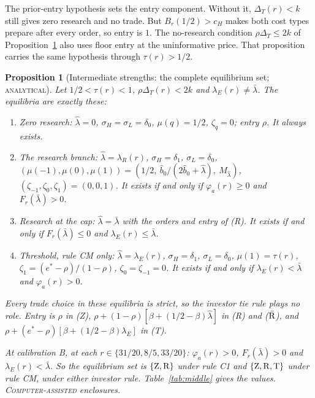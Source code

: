 \documentclass[12pt]{article}
\newtheorem{proposition}{Proposition}
\theoremstyle{definition}
\theoremstyle{remark}
\newcommand{\DT}{\Delta_T}
\newcommand{\lh}{\hat\lambda}
\newcommand{\lb}{\bar\lambda}
\newcommand{\st}[1]{\textsc{#1}}
\begin{document}
The prior-entry hypothesis sets the entry component. Without it, $\DT(r)<k$ still gives zero research and no
trade. But $B_r(1/2)>c_H$ makes both cost types prepare after every order, so entry is $1$. The no-research
condition $\rho\DT\le2k$ of Proposition~\ref{prop:middle} also uses floor entry at the uninformative price. That
proposition carries the same hypothesis through $\tau(r)>1/2$.

\begin{proposition}[Intermediate strengths: the complete equilibrium set; \st{analytical}]\label{prop:middle}
Let $1/2<\tau(r)<1$, $\rho\DT(r)<2k$ and $\lambda_E(r)\ne\lb$. The equilibria are exactly these:
\begin{enumerate}[label=(\Alph*),nosep]
\item[(Z)] \emph{Zero research:} $\lh=0$, $\sigma_H=\sigma_L=\delta_0$, $\mu(q)=1/2$, $\zeta_q=0$; entry $\rho$.
  It always exists.
\item[(R)] \emph{The research branch:} $\lh=\lambda_R(r)$, $\sigma_H=\delta_1$, $\sigma_L=\delta_0$,
  $(\mu(-1),\mu(0),\mu(1))=(1/2,\ \hat b_0/(2\hat b_0+\lh),\ M_{\lh})$, $(\zeta_{-1},\zeta_0,\zeta_1)=(0,0,1)$. It exists
  if and only if $\varphi_a(r)\ge0$ and $F_r(\lb)>0$.
\item[($\bar{\rm R}$)] \emph{Research at the cap:} $\lh=\lb$ with the orders and entry of (R). It exists if and only if
  $F_r(\lb)\le0$ and $\lambda_E(r)\le\lb$.
\item[(T)] \emph{Threshold, rule CM only:} $\lh=\lambda_E(r)$, $\sigma_H=\delta_1$, $\sigma_L=\delta_0$, $\mu(1)=\tau(r)$,
  $\zeta_1=(e^*-\rho)/(1-\rho)$, $\zeta_0=\zeta_{-1}=0$. It exists if and only if $\lambda_E(r)<\lb$ and
  $\varphi_a(r)>0$.
\end{enumerate}
Every trade choice in these equilibria is strict, so the investor tie rule plays no role. Entry is $\rho$ in (Z),
$\rho+(1-\rho)[\beta+(1/2-\beta)\lh]$ in (R) and ($\bar{\rm R}$), and $\rho+(e^*-\rho)[\beta+(1/2-\beta)\lambda_E]$ in
(T).

At calibration B, at each $r\in\{31/20,8/5,33/20\}$: $\varphi_a(r)>0$, $F_r(\lb)>0$ and $\lambda_E(r)<\lb$. So the
equilibrium set is $\{{\rm Z},{\rm R}\}$ under rule C1 and $\{{\rm Z},{\rm R},{\rm T}\}$ under rule CM, under either
investor rule. Table~\ref{tab:middle} gives the values. \st{Computer-assisted} enclosures.
\end{proposition}
\end{document}
